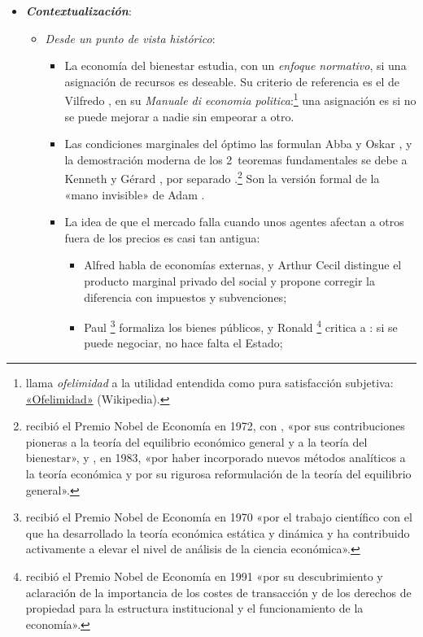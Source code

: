 \documentclass[11pt]{article}
\begin{document}
\begin{itemize}
\item \textbf{\emph{Contextualización}}:
  \begin{itemize}
  \item \emph{Desde un punto de vista histórico}:
  \begin{itemize}
  \item La economía del bienestar estudia, con un \emph{enfoque normativo}, si una asignación de recursos es deseable. Su criterio de referencia es el de Vilfredo \textcite{Pareto1906Manuale}, en su \emph{Manuale di economia politica}:\footnote{ llama \emph{ofelimidad} a la utilidad entendida como pura satisfacción subjetiva: \href{https://es.wikipedia.org/wiki/Ofelimidad}{«Ofelimidad»} (Wikipedia).} una asignación es  si no se puede mejorar a nadie sin empeorar a otro.
  \item Las condiciones marginales del óptimo las formulan Abba \textcite{Lerner1934Economic} y Oskar \textcite{Lange1942Foundations}, y la demostración moderna de los 2~teoremas fundamentales se debe a Kenneth \textcite{Arrow1951Extension} y Gérard \textcite{Debreu1951Coefficient}, por separado .\footnote{ recibió el Premio Nobel de Economía en 1972, con , «por sus contribuciones pioneras a la teoría del equilibrio económico general y a la teoría del bienestar»\nocite{Nobel1972HicksArrow}, y , en 1983, «por haber incorporado nuevos métodos analíticos a la teoría económica y por su rigurosa reformulación de la teoría del equilibrio general»\nocite{Nobel1983Debreu}.} Son la versión formal de la «mano invisible» de Adam \textcite{Smith1776Wealth}.
  \item La idea de que el mercado falla cuando unos agentes afectan a otros fuera de los precios es casi tan antigua:
    \begin{itemize}
    \item Alfred \textcite{Marshall1890Principles} habla de economías externas, y Arthur Cecil \textcite{Pigou1920Economics} distingue el producto marginal privado del social y propone corregir la diferencia con impuestos y subvenciones;
    \item Paul \textcite{Samuelson1954Pure}\footnote{ recibió el Premio Nobel de Economía en 1970 «por el trabajo científico con el que ha desarrollado la teoría económica estática y dinámica y ha contribuido activamente a elevar el nivel de análisis de la ciencia económica»\nocite{Nobel1970Samuelson}.} formaliza los bienes públicos, y Ronald \textcite{Coase1960Problem}\footnote{ recibió el Premio Nobel de Economía en 1991 «por su descubrimiento y aclaración de la importancia de los costes de transacción y de los derechos de propiedad para la estructura institucional y el funcionamiento de la economía»\nocite{Nobel1991Coase}.} critica a : si se puede negociar, no hace falta el Estado;

\end{itemize}
\end{itemize}
\end{itemize}
\end{itemize}
\end{document}
